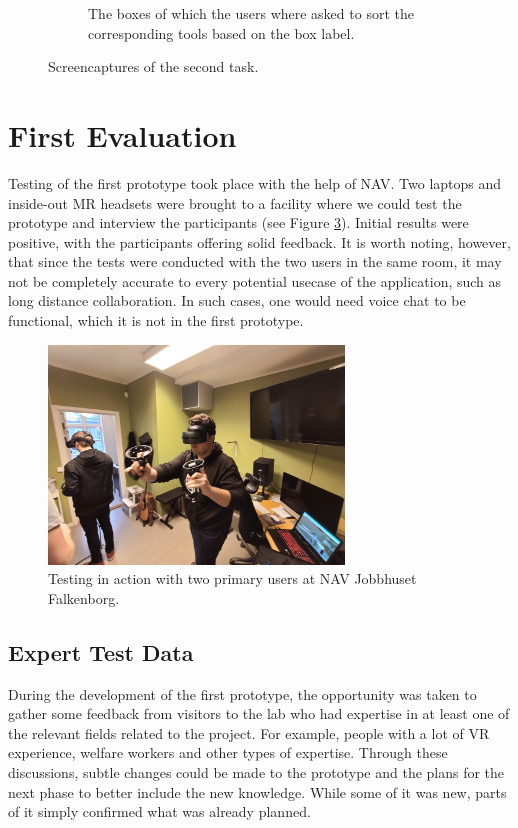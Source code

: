 \begin{figure}[]
\begin{subfigure}[b]{0.65\textwidth}
    \caption{The boxes of which the users where asked to sort the corresponding tools based on the box label.}
    \label{fig:task2SortingBoxes}
  \end{subfigure}
  \hfill%
  \caption{Screencaptures of the second task.}
  \label{fig:phase1Capture2}
\end{figure}


\section{First Evaluation}
Testing of the first prototype took place with the help of NAV. Two laptops and inside-out MR headsets were brought to a facility where we could test the prototype and interview the participants (see Figure \ref{fig:testingPhase1}). Initial results were positive, with the participants offering solid feedback. It is worth noting, however, that since the tests were conducted with the two users in the same room, it may not be completely accurate to every potential usecase of the application, such as long distance collaboration. In such cases, one would need voice chat to be functional, which it is not in the first prototype.

\begin{figure}[H]
  \centering
    \captionsetup{width=.7\linewidth}
    \includegraphics[width=0.7\textwidth]{fig/phase_1/testingPhase1.jpg}
 \caption{Testing in action with two primary users at NAV Jobbhuset Falkenborg.}
\label{fig:testingPhase1}
\end{figure}


\subsection{Expert Test Data}
During the development of the first prototype, the opportunity was taken to gather some feedback from visitors to the lab who had expertise in at least one of the relevant fields related to the project. For example, people with a lot of VR experience, welfare workers and other types of expertise. Through these discussions, subtle changes could be made to the prototype and the plans for the next phase to better include the new knowledge. While some of it was new, parts of it simply confirmed what was already planned.

